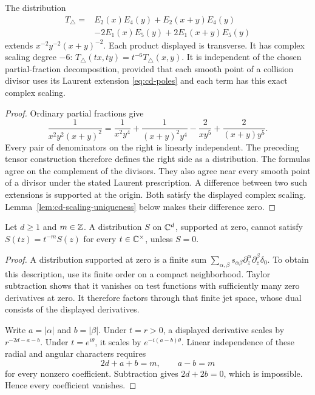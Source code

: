 \begin{proposition}
\label{prop:cd-triangle}
The distribution
\begin{equation}
 \label{eq:cd-triangle}
 \begin{split}
 T_\triangle={}&E_2(x)E_4(y)+E_2(x+y)E_4(y)\\
 &-2E_1(x)E_5(y)+2E_1(x+y)E_5(y)
 \end{split}
\end{equation}
extends $x^{-2}y^{-2}(x+y)^{-2}$.  Each product displayed is transverse.
It has complex scaling degree $-6$:
$T_\triangle(tx,ty)=t^{-6}T_\triangle(x,y)$.
It is independent of the chosen partial-fraction decomposition, provided
that each smooth point of a collision divisor uses its Laurent extension
\eqref{eq:cd-poles} and each term has this exact complex scaling.
\end{proposition}
\begin{proof}
Ordinary partial fractions give
\[
 \frac1{x^2y^2(x+y)^2}
 =\frac1{x^2y^4}+\frac1{(x+y)^2y^4}
       -\frac2{xy^5}+\frac2{(x+y)y^5}.
\]
Every pair of denominators on the right is linearly independent.
The preceding tensor construction therefore defines the right side
as a distribution.  The formulas agree on the complement of the divisors.
They also agree near every smooth point of a divisor under the stated
Laurent prescription.  A difference between two such extensions is supported
at the origin.  Both satisfy the displayed complex scaling.
Lemma~\ref{lem:cd-scaling-uniqueness} below makes their difference zero.
\end{proof}

\begin{lemma}
\label{lem:cd-scaling-uniqueness}
Let $d\ge1$ and $m\in\mathbb Z$.
A distribution $S$ on $\mathbb C^d$, supported at zero, cannot satisfy
$S(tz)=t^{-m}S(z)$ for every $t\in\mathbb C^\times$, unless $S=0$.
\end{lemma}
\begin{proof}
A distribution supported at zero is a finite sum
$\sum_{\alpha,\beta}s_{\alpha\beta}
\partial_z^\alpha\partial_{\bar z}^\beta\delta_0$.
To obtain this description, use its finite order on a compact neighborhood.
Taylor subtraction shows that it vanishes on test functions with sufficiently
many zero derivatives at zero.  It therefore factors through that finite
jet space, whose dual consists of the displayed derivatives.

Write $a=|\alpha|$ and $b=|\beta|$.
Under $t=r>0$, a displayed derivative scales by $r^{-2d-a-b}$.
Under $t=e^{i\theta}$, it scales by $e^{-i(a-b)\theta}$.
Linear independence of these radial and angular characters requires
\[
 2d+a+b=m,\qquad a-b=m
\]
for every nonzero coefficient.  Subtraction gives $2d+2b=0$, which is
impossible.  Hence every coefficient vanishes.
\end{proof}

